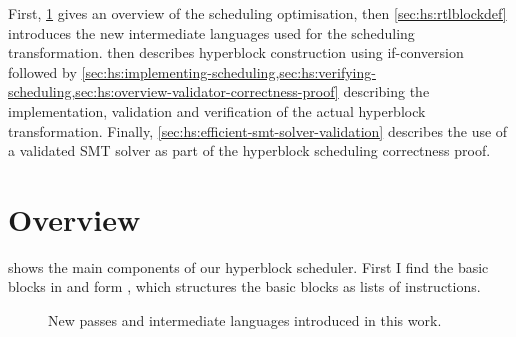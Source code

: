First, \cref{sec:hs:overview} gives an overview of the scheduling optimisation,
then \cref{sec:hs:rtlblockdef} introduces the new intermediate languages used
for the scheduling transformation.   then describes
hyperblock construction using if-conversion followed by
\cref{sec:hs:implementing-scheduling,sec:hs:verifying-scheduling,sec:hs:overview-validator-correctness-proof}
describing the implementation, validation and verification of the actual
hyperblock transformation.  Finally,
\cref{sec:hs:efficient-smt-solver-validation} describes the use of a validated
SMT solver as part of the hyperblock scheduling correctness proof.

\section{Overview}
\label{sec:hs:overview}

 shows the main components of our hyperblock
scheduler.  First I find the basic blocks in \rtl{} and form \rtlblock{}, which
structures the basic blocks as lists of instructions.

\begin{figure}
\hypersetup{hidelinks}
\centering
{}
  \caption{New passes and intermediate languages introduced in this work.}%
  \label{fig:compcert_interm}
\end{figure}

